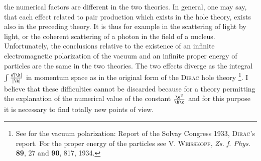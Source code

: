 \documentclass{article}
\renewcommand{\it}[1]{\textit{#1}}
\renewcommand{\sc}[1]{\textsc{#1}}
\begin{document}
the numerical factors are different in the two theories. In general, one may say, that each effect related to pair production which exists in the hole theory, exists also in the preceding theory. It is thus for example in the scattering of light by light, or the coherent scattering of a photon in the field of a nucleus.
Unfortunately, the conclusions relative to the existence of an infinite electromagnetic polarization of the vacuum and an infinite proper energy of particles are the same in the two theories. The two effects diverge as the integral $\int\frac{d|\k|}{|\k|}$ in momentum space as in the original form of the \sc{Dirac} hole theory \footnote{See for the vacuum polarization: Report of the Solvay Congress 1933, \sc{Dirac}'s report. For the proper energy of the particles see \sc{V. Weisskopf}, \it{Zs. f. Phys.} \textbf{89}, 27 and \textbf{90}, 817, 1934.}.
I believe that these difficulties cannot be discarded because for a theory permitting the explanation of the numerical value of the constant $\frac{\e^2}{\h\c}$ and for this purpose it is necessary to find totally new points of view.
\end{document}

